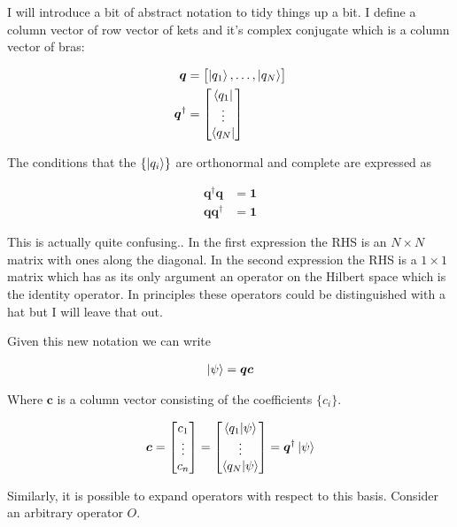 \documentclass[12pt]{article}
\newcommand{\bv}[1]{\boldsymbol{#1}}
\begin{document}
I will introduce a bit of abstract notation to tidy things up a bit. I define a column vector of row vector of kets and it's complex conjugate which is a column vector of bras:

\begin{align}
\bv{q} &= \begin{bmatrix}\ket{q_1},\ldots,\ket{q_N}\end{bmatrix}\\
\bv{q}^{\dag} &= \begin{bmatrix}\bra{q_1}\\\vdots\\\bra{q_N}\end{bmatrix}
\end{align}

The conditions that the $\{\ket{q_i}\}$ are orthonormal and complete are expressed as

\begin{align}
\bv{q}^{\dag}\bv{q} &= \bv{1}\\
\bv{q}\bv{q}^{\dag} &= \bv{1}
\end{align}

This is actually quite confusing.. In the first expression the RHS is an $N\times N$ matrix with ones along the diagonal. In the second expression the RHS is a $1 \times 1$ matrix which has as its only argument an operator on the Hilbert space which is the identity operator. In principles these operators could be distinguished with a hat but I will leave that out.

Given this new notation we can write

\begin{align}
\ket{\psi} = \bv{q}\bv{c}
\end{align}

Where $\bv{c}$ is a column vector consisting of the coefficients $\{c_i\}$.

\begin{align}
\bv{c} = \begin{bmatrix}
c_1\\ \vdots\\ c_n
\end{bmatrix} = 
\begin{bmatrix}
\braket{q_1|\psi}\\ \vdots \\ \braket{q_N|\psi} 
\end{bmatrix}
= \bv{q}^{\dag} \ket{\psi}
\end{align}

Similarly, it is possible to expand operators with respect to this basis. Consider an arbitrary operator $O$. 
\end{document}
